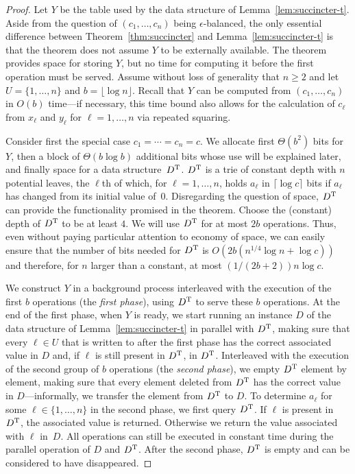 \documentclass[envcountsame,envcountsect,undated,nolinenumbers]{lnthi}
\def\Tfloor#1{\lfloor #1\rfloor}
\def\Tceil#1{\lceil #1\rceil}
\begin{document}
\begin{proof}
Let $Y$ be the table
used by the data structure
of Lemma~\ref{lem:succincter-t}.
Aside from the question of $(c_1,\ldots,c_n)$
being $\epsilon$-balanced,
the only essential difference between 
Theorem~\ref{thm:succincter} and
Lemma~\ref{lem:succincter-t} is that the
theorem does not assume $Y$ to be externally
available.
The theorem provides space for storing $Y$,
but no time for computing it before the first
operation must be served.
Assume without loss of generality that $n\ge 2$
and let $U=\{1,\ldots,n\}$ and $b=\Tfloor{\log n}$.
Recall that $Y$
can be computed from $(c_1,\ldots,c_n)$ in $O(b)$ time---if
necessary, this time bound also allows for the calculation
of $c_\ell$ from $x_\ell$ and $y_\ell$
for $\ell=1,\ldots,n$ via repeated squaring.

Consider first the special case $c_1=\cdots=c_n=c$.
We allocate first $\Theta(b^2)$ bits for $Y$,
then a block of $\Theta(b\log b)$ additional bits whose use
will be explained later, and finally
space for a data structure~$D^{\mbox{\scriptsize T}}$.
$D^{\mbox{\scriptsize T}}$ is a trie of constant depth with $n$ potential leaves,
the $\ell$th of which, for $\ell=1,\ldots,n$,
holds $a_\ell$ in $\Tceil{\log c}$ bits
if $a_\ell$ has changed from its
initial value of~0.
Disregarding the question of space,
$D^{\mbox{\scriptsize T}}$ can provide the functionality promised in
the theorem.
Choose the (constant) depth of $D^{\mbox{\scriptsize T}}$ to
be at least $4$.
We will use $D^{\mbox{\scriptsize T}}$ for at most $2 b$ operations.
Thus, even without paying particular attention
to economy of space, we can easily ensure
that the number of bits needed for $D^{\mbox{\scriptsize T}}$ is
$O(2 b (n^{{1/4}}\log n+\log c))$ and
therefore, for $n$ larger than a constant, at most
$({1/{(2 b+2)}})n\log c$.

We construct $Y$ in a background process
interleaved with the execution of the first
$b$ operations (the \emph{first phase}),
using $D^{\mbox{\scriptsize T}}$ to serve these $b$ operations.
At the end of the first phase,
when $Y$ is ready, we start running an
instance $D$ of the data structure of
Lemma~\ref{lem:succincter-t} in parallel
with $D^{\mbox{\scriptsize T}}$, making sure that every
$\ell\in U$ that
is written to
after the first phase
has the correct associated value
in $D$ and, if $\ell$ is still present in $D^{\mbox{\scriptsize T}}$,
in $D^{\mbox{\scriptsize T}}$.
Interleaved with the execution of the second
group of $b$ operations (the \emph{second phase}), we empty $D^{\mbox{\scriptsize T}}$
element by element, making
sure that every element deleted from $D^{\mbox{\scriptsize T}}$
has the correct value in $D$---informally, we transfer the element
from $D^{\mbox{\scriptsize T}}$ to $D$.
To determine $a_\ell$
for some $\ell\in\{1,\ldots,n\}$ in the second phase,
we first query $D^{\mbox{\scriptsize T}}$.
If $\ell$ is present in~$D^{\mbox{\scriptsize T}}$,
the associated value is returned.
Otherwise we return the value
associated with $\ell$ in~$D$.
All operations can
still be executed
in constant time
during the parallel operation of
$D$ and $D^{\mbox{\scriptsize T}}$.
After the second phase, $D^{\mbox{\scriptsize T}}$
is empty and can be considered to have disappeared.


\end{proof}
\end{document}

